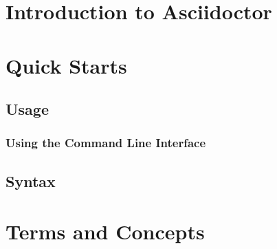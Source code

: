 \hypertarget{_introduction_to_asciidoctor}{\section{Introduction to Asciidoctor}}
\hypertarget{_quick_starts}{\section{Quick Starts}}
\hypertarget{_usage}{\subsection{Usage}}
\hypertarget{_using_the_command_line_interface}{\subsubsection{Using the Command Line Interface}}
\hypertarget{_syntax}{\subsection{Syntax}}
\hypertarget{_terms_and_concepts}{\section{Terms and Concepts}}
